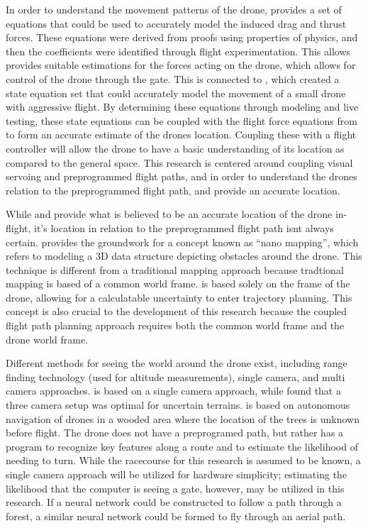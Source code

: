 \documentclass[onecolumn,10pt]{IEEEtran}
\begin{document}
In order to understand the movement patterns of the drone, \cite{svacha2017improving} provides a set of equations that could be used to accurately model the induced drag and thrust forces. These equations were derived from proofs using properties of physics, and then the coefficients were identified through flight experimentation. This allows provides suitable estimations for the forces acting on the drone, which allows for control of the drone through the gate. This is connected to \cite{loianno2017estimation}, which created a state equation set that could accurately model the movement of a small drone with aggressive flight. By determining these equations through modeling and live testing, these state equations can be coupled with the flight force equations from \cite{svacha2017improving} to form an accurate estimate of the drones location. Coupling these with a flight controller will allow the drone to have a basic understanding of its location as compared to the general space. This research is centered around coupling visual servoing and preprogrammed flight paths, and in order to understand the drones relation to the preprogrammed flight path, \cite{svacha2017improving} and \cite{loianno2017estimation} provide an accurate location. 

While \cite{svacha2017improving} and \cite{loianno2017estimation} provide what is believed to be an accurate location of the drone in-flight, it’s location in relation to the preprogrammed flight path isnt always certain. \cite{florence2018nanomap} provides the groundwork for a concept known as ``nano mapping'', which refers to modeling a 3D data structure depicting obstacles around the drone. This technique is different from a traditional mapping approach because tradtional mapping is based of a common world frame. \cite{florence2018nanomap} is based solely on the frame of the drone, allowing for a calculatable uncertainty to enter trajectory planning. This concept is also crucial to the development of this research because the coupled flight path planning approach requires both the common world frame and the drone world frame.

Different methods for seeing the world around the drone exist, including range finding technology (used for altitude measurements), single camera, and multi camera approaches. \cite{loianno2017estimation} is based on a single camera approach, while \cite{zhilenkov2018use} found that a three camera setup was optimal for uncertain terrains. \cite{zhilenkov2018use} is based on autonomous navigation of drones in a wooded area where the location of the trees is unknown before flight. The drone does not have a preprogramed path, but rather has a program to recognize key features along a route and to estimate the likelihood of needing to turn. While the racecourse for this research is assumed to be known, a single camera approach will be utilized for hardware simplicity; estimating the likelihood that the computer is seeing a gate, however, may be utilized in this research. If a neural network could be constructed to follow a path through a forest, a similar neural network could be formed to fly through an aerial path.
\end{document}
